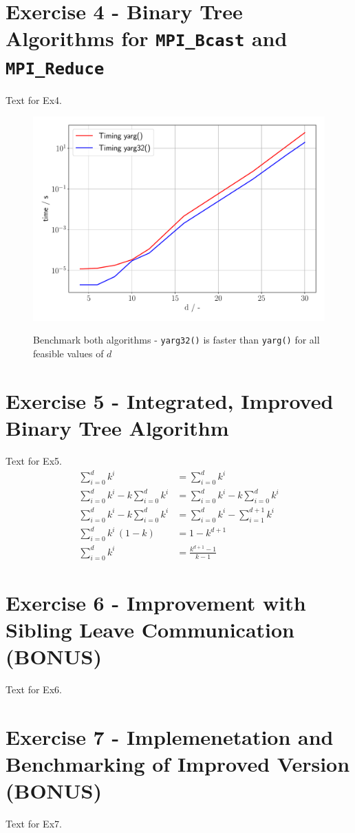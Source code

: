\section{Exercise 4 - Binary Tree Algorithms for \texttt{MPI\_Bcast} and \texttt{MPI\_Reduce}}
Text for Ex4.
\begin{figure}[h]
    \begin{center}
        \includegraphics[width= 0.88\linewidth]{figures/task_5_plot.pdf} 
        \label{ref_plot_task_5}
        \caption{Benchmark both algorithms - \texttt{yarg32()} is faster than \texttt{yarg()} for all feasible values of $d$}
    \end{center}
\end{figure}
\pagebreak

\section{Exercise 5 - Integrated, Improved Binary Tree Algorithm}
Text for Ex5.
\begin{equation}
    \begin{aligned}
        \sum_{i=0}^d k^i &= \sum_{i=0}^d k^i \\
        \sum_{i=0}^d k^i - k \sum_{i=0}^d k^i &= \sum_{i=0}^d k^i - k \sum_{i=0}^d k^i \\
        \sum_{i=0}^d k^i - k \sum_{i=0}^d k^i &= \sum_{i=0}^d k^i - \sum_{i=1}^{d+1} k^i \\
        \sum_{i=0}^d k^i \, (1-k) &= 1 - k^{d+1}\\
        \sum_{i=0}^d k^i   &=  \frac{k^{d+1} - 1}{k-1}
        \label{closedForm_Ex1.1}
    \end{aligned}
    \end{equation}
\pagebreak

\section{Exercise 6 - Improvement with Sibling Leave Communication (BONUS)}
Text for Ex6.
\pagebreak


\section{Exercise 7 - Implemenetation and Benchmarking of Improved Version (BONUS)}
Text for Ex7.
\pagebreak